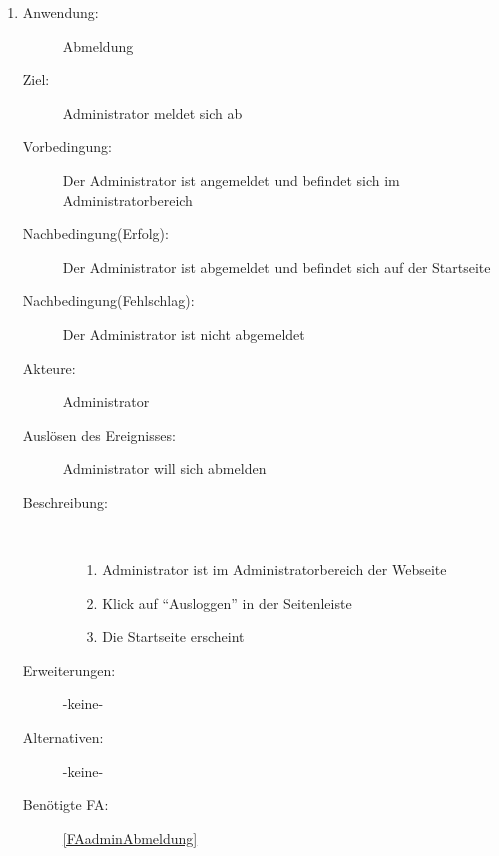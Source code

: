 \documentclass[parskip=full]{scrartcl}
\newcommand{\swtLabel}[1]{\textbf{/#1\arabic*0/}}
\begin{document}
\begin{enumerate} [label=\swtLabel{A}]
  \item \label{UCadminLogout}
    \begin{description}
  	\item[Anwendung:] Abmeldung
  	\item[Ziel:] Administrator meldet sich ab
  	\item[Vorbedingung:] Der Administrator ist angemeldet und befindet sich im Administratorbereich
  	\item[Nachbedingung(Erfolg):] Der Administrator ist abgemeldet und befindet sich auf der Startseite
  	\item[Nachbedingung(Fehlschlag):] Der Administrator ist nicht abgemeldet
  	\item[Akteure:] Administrator
  	\item[Auslösen des Ereignisses:] Administrator will sich abmelden
  	\item[Beschreibung:]~
  	\begin{enumerate}
  	  \item[1.] Administrator ist im Administratorbereich der Webseite
      \item[2.] Klick auf \enquote{Ausloggen} in der Seitenleiste
      \item[3.] Die Startseite erscheint
  	\end{enumerate}
  	\item[Erweiterungen:] -keine-
  	\item[Alternativen:] -keine-
  	\item[Benötigte FA:] \ref{FAadminAbmeldung}
  \end{description}
  

\end{enumerate}
\end{document}
